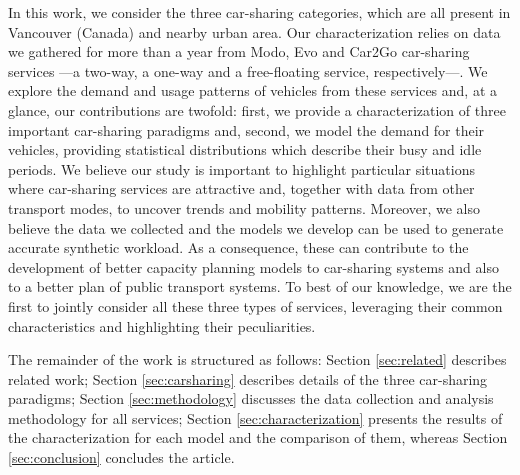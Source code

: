 In this work, we consider the three car-sharing categories, which are all present in Vancouver (Canada) and nearby urban area. Our characterization relies on data we gathered for more than a year from Modo, Evo and Car2Go car-sharing services ---a two-way, a one-way and a free-floating service, respectively---.
We explore the demand and usage patterns of vehicles from these services and, at a glance, our contributions are twofold: first, we provide a characterization of three important car-sharing paradigms and, second, we model the demand for their vehicles, providing statistical distributions which describe their busy and idle periods. 
We believe our study is important to highlight particular situations where car-sharing services are attractive and, together with data from other transport modes, to uncover trends and mobility patterns. Moreover, we also believe the data we collected
and the models we develop can be used to generate accurate synthetic workload. As a consequence, these can contribute to the development of better capacity planning models to car-sharing systems and also to a better plan of public transport systems.
To best of our knowledge, we are the first to jointly consider all these three types of services, leveraging their common characteristics and highlighting their peculiarities.


The remainder of the work is structured as follows:  Section \ref{sec:related} describes related work; Section \ref{sec:carsharing} describes details of the three car-sharing paradigms; Section \ref{sec:methodology} discusses the data collection and analysis methodology for all services; Section \ref{sec:characterization} presents the results of the characterization for each model and the comparison of them, whereas Section \ref{sec:conclusion} concludes the article.


